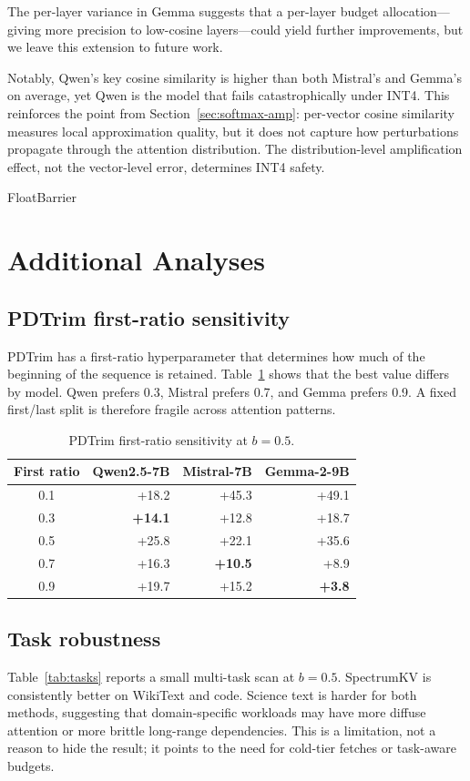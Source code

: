 \documentclass[11pt]{article}
\newcommand{\method}{SpectrumKV}
\newcommand{\budget}{b}
\theoremstyle{plain}
\theoremstyle{definition}
\begin{document}
The per-layer variance in Gemma suggests that a per-layer budget allocation---giving more precision to low-cosine layers---could yield further improvements, but we leave this extension to future work.

Notably, Qwen's key cosine similarity is higher than both Mistral's and Gemma's on average, yet Qwen is the model that fails catastrophically under INT4.  This reinforces the point from Section~\ref{sec:softmax-amp}: per-vector cosine similarity measures local approximation quality, but it does not capture how perturbations propagate through the attention distribution.  The distribution-level amplification effect, not the vector-level error, determines INT4 safety.

FloatBarrier
\section{Additional Analyses}
\label{sec:additional}

\subsection{PDTrim first-ratio sensitivity}
PDTrim has a first-ratio hyperparameter that determines how much of the beginning of the sequence is retained.  Table~\ref{tab:fr} shows that the best value differs by model.  Qwen prefers 0.3, Mistral prefers 0.7, and Gemma prefers 0.9.  A fixed first/last split is therefore fragile across attention patterns.

\begin{table}[h]
\centering
\caption{PDTrim first-ratio sensitivity at $\budget=0.5$.}
\label{tab:fr}
\small
\begin{tabular}{crrr}
\toprule
First ratio & Qwen2.5-7B & Mistral-7B & Gemma-2-9B \\
\midrule
0.1 & +18.2 & +45.3 & +49.1 \\
0.3 & \textbf{+14.1} & +12.8 & +18.7 \\
0.5 & +25.8 & +22.1 & +35.6 \\
0.7 & +16.3 & \textbf{+10.5} & +8.9 \\
0.9 & +19.7 & +15.2 & \textbf{+3.8} \\
\bottomrule
\end{tabular}
\end{table}

\subsection{Task robustness}
Table~\ref{tab:tasks} reports a small multi-task scan at $\budget=0.5$.  \method{} is consistently better on WikiText and code.  Science text is harder for both methods, suggesting that domain-specific workloads may have more diffuse attention or more brittle long-range dependencies.  This is a limitation, not a reason to hide the result; it points to the need for cold-tier fetches or task-aware budgets.
\end{document}

